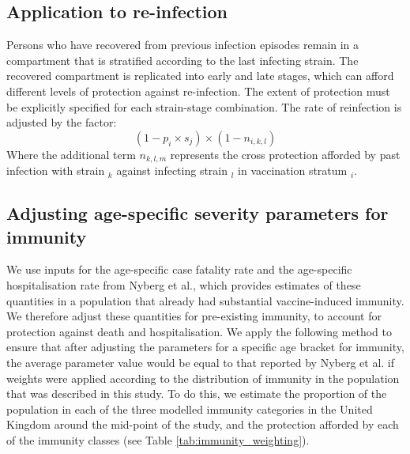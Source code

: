 \subsection{Application to re-infection}
Persons who have recovered from previous infection episodes remain in a compartment that is stratified
according to the last infecting strain.
The recovered compartment is replicated into early and late stages,
which can afford different levels of protection against re-infection.
The extent of protection must be explicitly specified for each strain-stage combination.
The rate of reinfection is adjusted by the factor:
\[(1 - p_{i} \times s_{j})\times (1 - n_{i,k,l})\]
Where the additional term \(n_{k,l,m}\) represents the cross protection
afforded by past infection with strain \(_{k}\)
against infecting strain \(_{l}\)
in vaccination stratum \(_{i}\).

\subsection{Adjusting age-specific severity parameters for immunity}
We use inputs for the age-specific case fatality rate and the age-specific hospitalisation rate from Nyberg et al., 
which provides estimates of these quantities in a population that already had substantial vaccine-induced immunity.
We therefore adjust these quantities for pre-existing immunity, to account for protection against death and hospitalisation.
We apply the following method to ensure that after adjusting the parameters for a specific age bracket for immunity,
the average parameter value would be equal to that reported by Nyberg et al. if weights were applied according to the
distribution of immunity in the population that was described in this study.
To do this, we estimate the proportion of the population in each of the three modelled immunity categories
in the United Kingdom around the mid-point of the study,
and the protection afforded by each of the immunity classes (see Table \ref{tab:immunity_weighting}).

